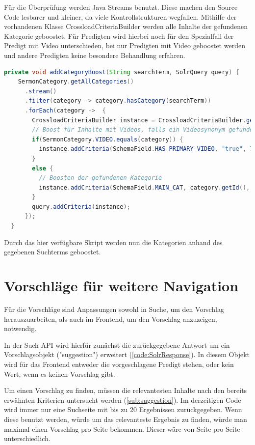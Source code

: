 Für die Überprüfung werden Java Streams benutzt.
Diese machen den Source Code lesbarer und kleiner, da viele Kontrollstrukturen wegfallen.
Mithilfe der vorhandenen Klasse CrossloadCriteriaBuilder werden alle Inhalte der gefundenen Kategorie geboostet.
Für Predigten wird hierbei noch für den Spezialfall der Predigt mit Video unterschieden, bei nur Predigten mit Video geboostet werden und andere Predigten keine besondere Behandlung erfahren.

\clearpage
\begin{lstlisting}[language=Java, title={Code für Überprüfung und Boosten der Kategorien. \cite{solr-search2022}}]
  private void addCategoryBoost(String searchTerm, SolrQuery query) {
    SermonCategory.getAllCategories()
      .stream()
      .filter(category -> category.hasCategory(searchTerm))
      .forEach(category ->  {
        CrossloadCriteriaBuilder instance = CrossloadCriteriaBuilder.getInstance();
        // Boost für Inhalte mit Videos, falls ein Videosynonym gefunden.
        if(SermonCategory.VIDEO.equals(category)) {
          instance.addCriteria(SchemaField.HAS_PRIMARY_VIDEO, "true", 75);
        }
        else {
          // Boosten der gefundenen Kategorie
          instance.addCriteria(SchemaField.MAIN_CAT, category.getId(), 3);
        }
        query.addCriteria(instance);
      });
  }
\end{lstlisting}

Durch das hier verfügbare Skript werden nun die Kategorien anhand des gegebenen Suchterms geboostet.

\section{Vorschläge für weitere Navigation}
\label{sec:devSuggestions}

Für die Vorschläge sind Anpassungen sowohl in Suche, um den Vorschlag herauszuarbeiten, als auch im Frontend, um den Vorschlag anzuzeigen, notwendig.

In der Such API wird hierfür zunächst die zurückgegebene Antwort um ein Vorschlagsobjekt ("suggestion") erweitert (\ref{code:SolrResponse}).
In diesem Objekt wird für das Frontend entweder die vorgeschlagene Predigt stehen, oder kein Wert, wenn es keinen Vorschlag gibt.

Um einen Vorschlag zu finden, müssen die relevantesten Inhalte nach den bereits erwähnten Kriterien untersucht werden (\ref{sub:suggestion}).
Im derzeitigen Code wird immer nur eine Suchseite mit bis zu 20 Ergebnissen zurückgegeben.
Wenn diese benutzt werden, würde um das relevanteste Ergebnis zu finden, würde man maximal einen Vorschlag pro Seite bekommen.
Dieser wäre von Seite pro Seite unterschiedlich.

